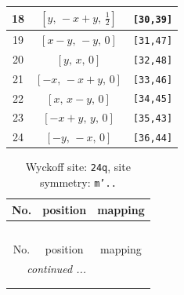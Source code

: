\documentclass[fleqn,8pt]{jsarticle}
\begin{document}
\begin{longtable}{ccc}
18 & $\left[ y,\, - x + y,\, \frac{1}{2} \right]$ & {\tt [30,39]} \\ \hline
19 & $\left[ x - y,\, - y,\, 0 \right]$ & {\tt [31,47]} \\ \hline
20 & $\left[ y,\, x,\, 0 \right]$ & {\tt [32,48]} \\ \hline
21 & $\left[ - x,\, - x + y,\, 0 \right]$ & {\tt [33,46]} \\ \hline
22 & $\left[ x,\, x - y,\, 0 \right]$ & {\tt [34,45]} \\ \hline
23 & $\left[ - x + y,\, y,\, 0 \right]$ & {\tt [35,43]} \\ \hline
24 & $\left[ - y,\, - x,\, 0 \right]$ & {\tt [36,44]} \\
\end{longtable}
\renewcommand{\arraystretch}{1.2}
\begin{longtable}{ccc}
\caption{Wyckoff site: {\tt 24q}, site symmetry: {\tt m'..}}
 \\
 \hline \hline
No. & position & mapping \\ \hline \endfirsthead

\multicolumn{2}{l}{\tablename\ \thetable{}} \\
 \hline \hline
No. & position & mapping \\ \hline \endhead

 \hline \hline
\multicolumn{2}{r}{\footnotesize\it continued ...} \\ \endfoot

 \hline \hline
\multicolumn{2}{r}{} \\ \endlastfoot


\end{longtable}
\end{document}
